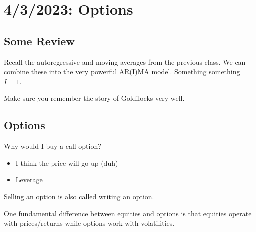 \chapter{4/3/2023: Options}

\section{Some Review}
Recall the autoregressive and moving averages from the previous class. We can combine these into the very powerful AR(I)MA model. Something something $I=1$.

Make sure you remember the story of Goldilocks very well.

\section{Options}
Why would I buy a call option? \begin{itemize}
	\item I think the price will go up (duh)
	\item Leverage
\end{itemize}
Selling an option is also called writing an option.

One fundamental difference between equities and options is that equities operate with prices/returns while options work with volatilities.


